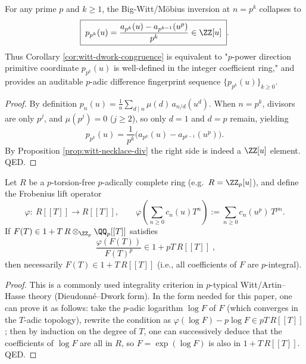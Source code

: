 \begin{proposition}\label{prop:witt-ppower-primitive-coordinate}
For any prime \(p\) and \(k\ge 1\), the Big-Witt/Möbius inversion at \(n=p^k\) collapses to
\[
\boxed{\;
p_{p^k}(u)=\frac{a_{p^k}(u)-a_{p^{k-1}}(u^p)}{p^k}\in\ZZ[u]\; }.
\]
Thus Corollary \ref{cor:witt-dwork-congruence} is equivalent to "\(p\)-power direction primitive coordinate \(p_{p^k}(u)\) is well-defined in the integer coefficient ring," and provides an auditable \(p\)-adic difference fingerprint sequence \(\{p_{p^k}(u)\}_{k\ge 0}\).
\end{proposition}
\begin{proof}
By definition
\(
p_n(u)=\frac{1}{n}\sum_{d\mid n}\mu(d)\,a_{n/d}(u^d)
\).
When \(n=p^k\), divisors are only \(p^j\), and \(\mu(p^j)=0\) (\(j\ge 2\)), so only \(d=1\) and \(d=p\) remain, yielding
\[
p_{p^k}(u)=\frac{1}{p^k}\bigl(a_{p^k}(u)-a_{p^{k-1}}(u^p)\bigr).
\]
By Proposition \ref{prop:witt-necklace-div} the right side is indeed a \(\ZZ[u]\) element. QED.
\end{proof}

\begin{lemma}\label{lem:witt-dieudonne-dwork}
Let \(R\) be a \(p\)-torsion-free \(p\)-adically complete ring (e.g.\ \(R=\ZZ_p[u]\)), and define the Frobenius lift operator
\[
\varphi:\ R[[T]]\to R[[T]],\qquad
\varphi\!\left(\sum_{n\ge 0}c_n(u)T^n\right):=\sum_{n\ge 0}c_n(u^p)\,T^{pn}.
\]
If \(F(T)\in 1+T\,R\otimes_{\ZZ_p}\QQ_p[[T]]\) satisfies
\[
\boxed{\;
\frac{\varphi(F(T))}{F(T)^p}\in 1+pT\,R[[T]]\;},
\]
then necessarily \(F(T)\in 1+T\,R[[T]]\) (i.e., all coefficients of \(F\) are \(p\)-integral).
\end{lemma}
\begin{proof}
This is a commonly used integrality criterion in \(p\)-typical Witt/Artin--Hasse theory (Dieudonné--Dwork form).
In the form needed for this paper, one can prove it as follows: take the \(p\)-adic logarithm \(\log F\) of \(F\) (which converges in the \(T\)-adic topology), rewrite the condition as
\(
\varphi(\log F)-p\log F\in pT\,R[[T]]
\);
then by induction on the degree of \(T\), one can successively deduce that the coefficients of \(\log F\) are all in \(R\), so \(F=\exp(\log F)\) is also in \(1+T\,R[[T]]\). QED.
\end{proof}


